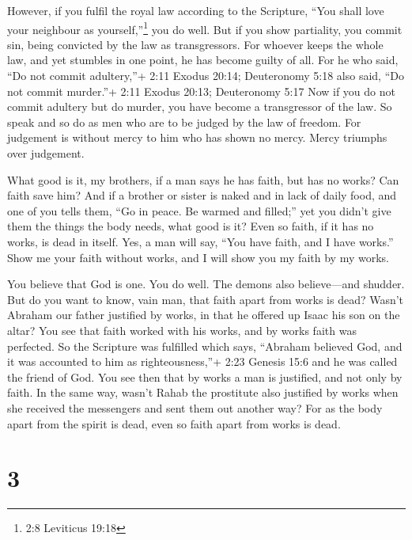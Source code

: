  However, if you fulfil the royal law according to the
Scripture, ``You shall love your neighbour as yourself,''\footnote{2:8
  Leviticus 19:18} you do well.  But if you show partiality,
you commit sin, being convicted by the law as transgressors.
 For whoever keeps the whole law, and yet stumbles in one
point, he has become guilty of all.  For he who said, ``Do
not commit adultery,''+ 2:11 Exodus 20:14; Deuteronomy 5:18 also said,
``Do not commit murder.''+ 2:11 Exodus 20:13; Deuteronomy 5:17 Now if
you do not commit adultery but do murder, you have become a transgressor
of the law.  So speak and so do as men who are to be judged
by the law of freedom.  For judgement is without mercy to
him who has shown no mercy. Mercy triumphs over judgement.

 What good is it, my brothers, if a man says he has faith,
but has no works? Can faith save him?  And if a brother or
sister is naked and in lack of daily food,  and one of you
tells them, ``Go in peace. Be warmed and filled;'' yet you didn't give
them the things the body needs, what good is it?  Even so
faith, if it has no works, is dead in itself.  Yes, a man
will say, ``You have faith, and I have works.'' Show me your faith
without works, and I will show you my faith by my works.

 You believe that God is one. You do well. The demons also
believe---and shudder.  But do you want to know, vain man,
that faith apart from works is dead?  Wasn't Abraham our
father justified by works, in that he offered up Isaac his son on the
altar?  You see that faith worked with his works, and by
works faith was perfected.  So the Scripture was fulfilled
which says, ``Abraham believed God, and it was accounted to him as
righteousness,''+ 2:23 Genesis 15:6 and he was called the friend of God.
 You see then that by works a man is justified, and not
only by faith.  In the same way, wasn't Rahab the
prostitute also justified by works when she received the messengers and
sent them out another way?  For as the body apart from the
spirit is dead, even so faith apart from works is dead.

\hypertarget{section-2}{%
\section{3}\label{section-2}}

